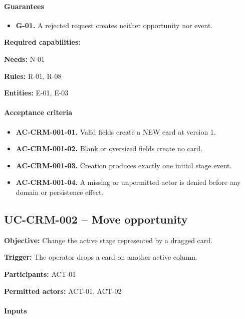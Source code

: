 \documentclass[10pt,a4paper]{article}
\begin{document}
\paragraph{Guarantees}

\begin{itemize}

\item \textbf{G-01.} A rejected request creates neither opportunity nor event.

\end{itemize}

\textbf{Required capabilities:} 

\textbf{Needs:} N-01

\textbf{Rules:} R-01, R-08

\textbf{Entities:} E-01, E-03

\paragraph{Acceptance criteria}

\begin{itemize}

\item \textbf{AC-CRM-001-01.} Valid fields create a NEW card at version 1.

\item \textbf{AC-CRM-001-02.} Blank or oversized fields create no card.

\item \textbf{AC-CRM-001-03.} Creation produces exactly one initial stage event.

\item \textbf{AC-CRM-001-04.} A missing or unpermitted actor is denied before any domain or persistence effect.

\end{itemize}

\subsection{UC-CRM-002 -- Move opportunity}

\textbf{Objective:} Change the active stage represented by a dragged card.

\textbf{Trigger:} The operator drops a card on another active column.

\textbf{Participants:} ACT-01

\textbf{Permitted actors:} ACT-01, ACT-02

\paragraph{Inputs}
\end{document}
